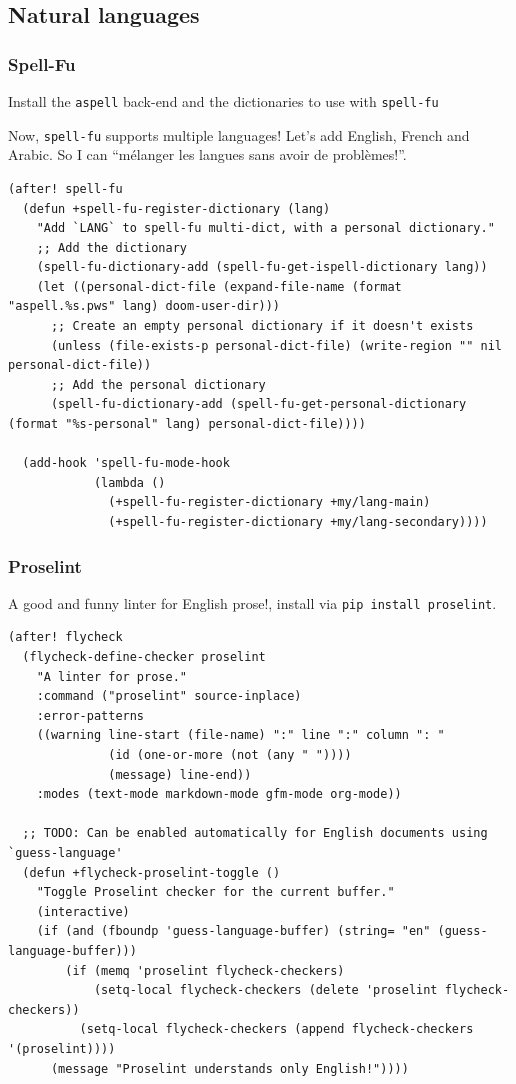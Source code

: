 \documentclass[11pt]{article}
\begin{document}
\subsection{Natural languages}
\label{sec:org85539f9}
\subsubsection{Spell-Fu}
\label{sec:orga06ff14}
Install the \texttt{aspell} back-end and the dictionaries to use with \texttt{spell-fu}

Now, \texttt{spell-fu} supports multiple languages! Let's add English, French and Arabic.
So I can ``mélanger les langues sans avoir de problèmes!''.

\begin{verbatim}
(after! spell-fu
  (defun +spell-fu-register-dictionary (lang)
    "Add `LANG` to spell-fu multi-dict, with a personal dictionary."
    ;; Add the dictionary
    (spell-fu-dictionary-add (spell-fu-get-ispell-dictionary lang))
    (let ((personal-dict-file (expand-file-name (format "aspell.%s.pws" lang) doom-user-dir)))
      ;; Create an empty personal dictionary if it doesn't exists
      (unless (file-exists-p personal-dict-file) (write-region "" nil personal-dict-file))
      ;; Add the personal dictionary
      (spell-fu-dictionary-add (spell-fu-get-personal-dictionary (format "%s-personal" lang) personal-dict-file))))

  (add-hook 'spell-fu-mode-hook
            (lambda ()
              (+spell-fu-register-dictionary +my/lang-main)
              (+spell-fu-register-dictionary +my/lang-secondary))))
\end{verbatim}

\subsubsection{Proselint}
\label{sec:orgfc3e498}
A good and funny linter for English prose!, install via \texttt{pip install proselint}.

\begin{verbatim}
(after! flycheck
  (flycheck-define-checker proselint
    "A linter for prose."
    :command ("proselint" source-inplace)
    :error-patterns
    ((warning line-start (file-name) ":" line ":" column ": "
              (id (one-or-more (not (any " "))))
              (message) line-end))
    :modes (text-mode markdown-mode gfm-mode org-mode))

  ;; TODO: Can be enabled automatically for English documents using `guess-language'
  (defun +flycheck-proselint-toggle ()
    "Toggle Proselint checker for the current buffer."
    (interactive)
    (if (and (fboundp 'guess-language-buffer) (string= "en" (guess-language-buffer)))
        (if (memq 'proselint flycheck-checkers)
            (setq-local flycheck-checkers (delete 'proselint flycheck-checkers))
          (setq-local flycheck-checkers (append flycheck-checkers '(proselint))))
      (message "Proselint understands only English!"))))
\end{verbatim}
\end{document}
